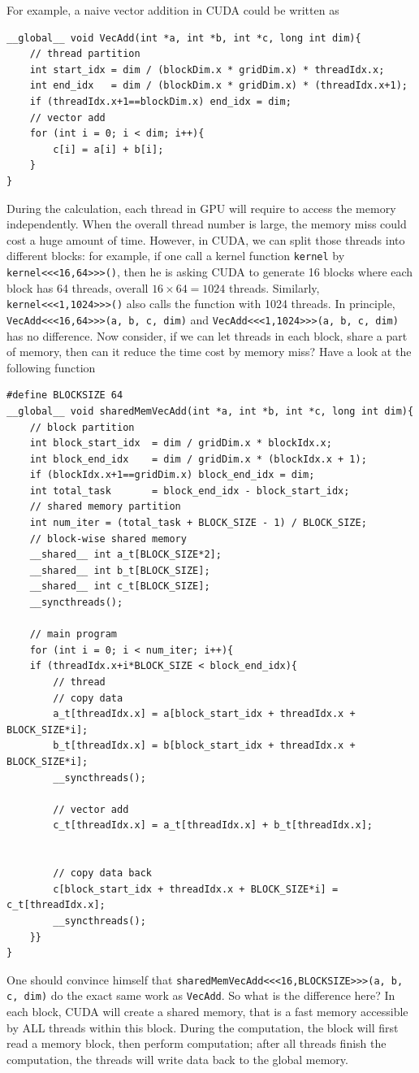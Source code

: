 \documentclass[twoside,12pt]{article}
\theoremstyle{definition}
\theoremstyle{remark}
\begin{document}
For example, a naive vector addition in CUDA could be written as
\begin{lstlisting}[style=cpp]
__global__ void VecAdd(int *a, int *b, int *c, long int dim){
    // thread partition
    int start_idx = dim / (blockDim.x * gridDim.x) * threadIdx.x;
    int end_idx   = dim / (blockDim.x * gridDim.x) * (threadIdx.x+1);
    if (threadIdx.x+1==blockDim.x) end_idx = dim;
    // vector add
    for (int i = 0; i < dim; i++){
        c[i] = a[i] + b[i];
    }
}
\end{lstlisting}
During the calculation, each thread in GPU will require to
access the memory independently.
When the overall thread number is large, the memory miss could
cost a huge amount of time.
However, in CUDA, we can split those threads into different blocks:
for example, if one call a kernel function \lstinline|kernel|
by \lstinline|kernel<<<16,64>>>()|, then he is asking CUDA
to generate 16 blocks where each block has 64 threads, overall 
$16\times 64=1024$ threads.
Similarly, \lstinline|kernel<<<1,1024>>>()| also calls the function
with 1024 threads.
In principle, \lstinline|VecAdd<<<16,64>>>(a, b, c, dim)| and
\lstinline|VecAdd<<<1,1024>>>(a, b, c, dim)| has no difference.
Now consider, if we can let threads in each block, share a 
part of memory, then can it reduce the time cost by memory miss?
Have a look at the following function
\begin{lstlisting}[style=cpp]
#define BLOCKSIZE 64
__global__ void sharedMemVecAdd(int *a, int *b, int *c, long int dim){
    // block partition
    int block_start_idx  = dim / gridDim.x * blockIdx.x;
    int block_end_idx    = dim / gridDim.x * (blockIdx.x + 1);
    if (blockIdx.x+1==gridDim.x) block_end_idx = dim;
    int total_task       = block_end_idx - block_start_idx;
    // shared memory partition
    int num_iter = (total_task + BLOCK_SIZE - 1) / BLOCK_SIZE;
    // block-wise shared memory
    __shared__ int a_t[BLOCK_SIZE*2];
    __shared__ int b_t[BLOCK_SIZE];
    __shared__ int c_t[BLOCK_SIZE];
    __syncthreads();

    // main program
    for (int i = 0; i < num_iter; i++){
    if (threadIdx.x+i*BLOCK_SIZE < block_end_idx){
        // thread
        // copy data
        a_t[threadIdx.x] = a[block_start_idx + threadIdx.x + BLOCK_SIZE*i];
        b_t[threadIdx.x] = b[block_start_idx + threadIdx.x + BLOCK_SIZE*i];
        __syncthreads();

        // vector add
        c_t[threadIdx.x] = a_t[threadIdx.x] + b_t[threadIdx.x];


        // copy data back
        c[block_start_idx + threadIdx.x + BLOCK_SIZE*i] = c_t[threadIdx.x];
        __syncthreads();
    }}
}
\end{lstlisting}
One should convince himself that \lstinline|sharedMemVecAdd<<<16,BLOCKSIZE>>>(a, b, c, dim)|
do the exact same work as \lstinline|VecAdd|.
So what is the difference here?
In each block, CUDA will create a shared memory, that is a fast memory accessible
by ALL threads within this block.
During the computation, the block will first read a memory block,
then perform computation; after all threads finish the computation,
the threads will write data back to the global memory.
\end{document}
